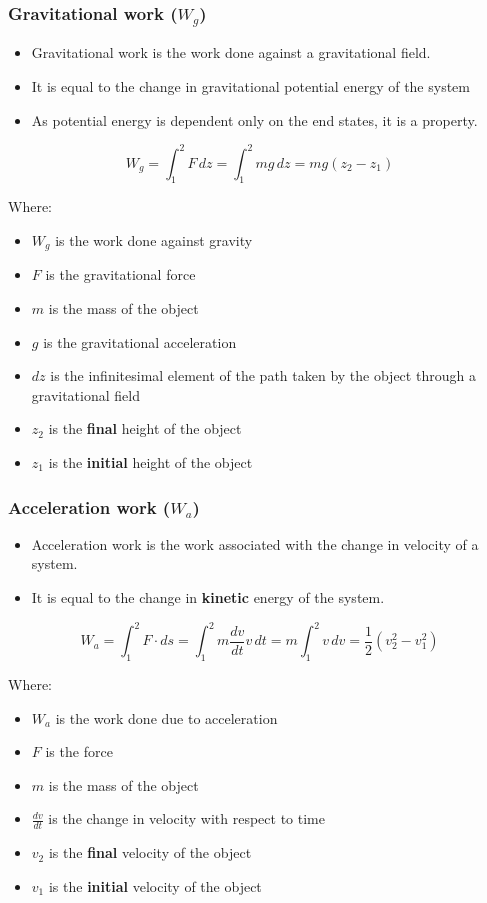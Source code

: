 \documentclass[11pt]{article}
\begin{document}
\subsubsection{Gravitational work (\(W_g\))}
\label{sec:org966d654}
\begin{itemize}
\item Gravitational work is the work done against a gravitational field.
\item It is equal to the change in gravitational potential energy of the system
\item As potential energy is dependent only on the end states, it is a property.
\end{itemize}

\[W_g = \int_1^2 F \, dz = \int_1^2 mg \, dz = mg(z_2 - z_1)\]

Where:
\begin{itemize}
\item \(W_g\) is the work done against gravity
\item \(F\) is the gravitational force
\item \(m\) is the mass of the object
\item \(g\) is the gravitational acceleration
\item \(dz\) is the infinitesimal element of the path taken by the object through a gravitational field
\item \(z_2\) is the \textbf{final} height of the object
\item \(z_1\) is the \textbf{initial} height of the object
\end{itemize}

\newpage

\subsubsection{Acceleration work (\(W_a\))}
\label{sec:orgb3ab721}
\begin{itemize}
\item Acceleration work is the work associated with the change in velocity of a system.
\item It is equal to the change in \textbf{kinetic} energy of the system.
\end{itemize}

\[W_a = \int_1^2 F \cdot ds = \int_1^2 m \frac{dv}{dt} v \, dt = m \int_1^2 v \, dv = \frac{1}{2} \left(v_2^2 - v_1^2 \right)\]

Where:
\begin{itemize}
\item \(W_a\) is the work done due to acceleration
\item \(F\) is the force
\item \(m\) is the mass of the object
\item \(\frac{dv}{dt}\) is the change in velocity with respect to time
\item \(v_2\) is the \textbf{final} velocity of the object
\item \(v_1\) is the \textbf{initial} velocity of the object
\end{itemize}
\end{document}
